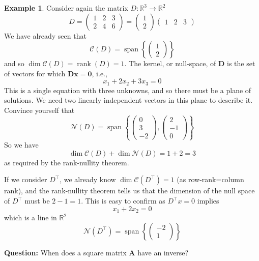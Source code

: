 \documentclass[
]{book}
\theoremstyle{definition}
\theoremstyle{definition}
\newtheorem{example}{Example}[chapter]
\theoremstyle{definition}
\theoremstyle{definition}
\theoremstyle{remark}
\begin{document}
\begin{example}
\protect\hypertarget{exm:ranknullityeg}{}{\label{exm:ranknullityeg} }Consider again the matrix \(D: \mathbb{R}^3\rightarrow \mathbb{R}^2\)
\[ D=\left( \begin{array}{ccc} 1 & 2&3\\ 2&4&6 \end{array}\right)= \left( \begin{array}{c} 1 \\ 2 \end{array}\right)\left(\begin{array}{ccc}1&2&3\end{array}\right)
\]
We have already seen that
\[\mathcal{C}(D)=\operatorname{span}\left\{\left(\begin{array}{c}1\\2\end{array}\right)\right\}\]
and so \(\dim \mathcal{C}(D)=\operatorname{rank}(D)=1\).
The kernel, or null-space, of \(\mathbf D\) is the set of vectors for which \(\mathbf D\mathbf x=\boldsymbol 0\), i.e.,
\[x_1+2x_2+3x_3=0\]
This is a single equation with three unknowns, and so there must be a plane of solutions. We need two linearly independent vectors in this plane to describe it. Convince yourself that
\[\mathcal{N}(D) = \operatorname{span}\left\{\left(\begin{array}{c}0\\3\\-2\end{array}\right), \left(\begin{array}{c}2\\-1\\0\end{array}\right)\right\}\]
So we have
\[\dim \mathcal{C}(D)+\dim \mathcal{N}(D)=1+2=3\]
as required by the rank-nullity theorem.

If we consider \(D^\top\), we already know \(\dim \mathcal{C}(D^\top)=1\) (as row-rank=column rank), and the rank-nullity theorem tells us that the dimension of the null space of \(D^\top\) must be \(2-1=1\). This is easy to confirm as \(D^\top x=0\) implies
\[x_1+2x_2=0\]
which is a line in \(\mathbb{R}^2\)
\[\mathcal{N}(D^\top) = \operatorname{span}\left\{ \left(\begin{array}{c}-2\\1\end{array}\right)\right\}\]
\end{example}

\textbf{Question:} When does a square matrix \(\mathbf A\) have an inverse?
\end{document}

